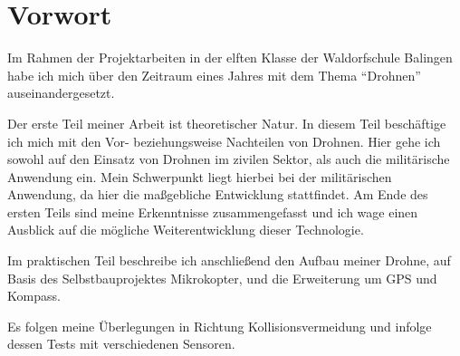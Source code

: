 \section{Vorwort}
Im Rahmen der Projektarbeiten in der elften Klasse der Waldorfschule Balingen habe ich mich
über den Zeitraum eines Jahres mit dem Thema \enquote{Drohnen} auseinandergesetzt.

\bigskip
Der erste Teil meiner Arbeit ist theoretischer Natur.
In diesem Teil beschäftige ich mich mit den Vor- beziehungsweise Nachteilen
von Drohnen. Hier gehe ich sowohl auf den Einsatz von Drohnen
im zivilen Sektor, als auch die militärische Anwendung ein.
Mein Schwerpunkt liegt hierbei bei der militärischen Anwendung,
da hier die maßgebliche Entwicklung stattfindet.
Am Ende des ersten Teils sind meine Erkenntnisse zusammengefasst
und ich wage einen Ausblick auf die mögliche Weiterentwicklung
dieser Technologie.

\bigskip
Im praktischen Teil beschreibe ich anschließend
den Aufbau meiner Drohne, auf Basis
des Selbstbauprojektes Mikrokopter,
und die Erweiterung um \ac{GPS} und Kompass.

\bigskip
Es folgen meine Überlegungen in Richtung
Kollisionsvermeidung
und infolge dessen Tests mit verschiedenen Sensoren.
